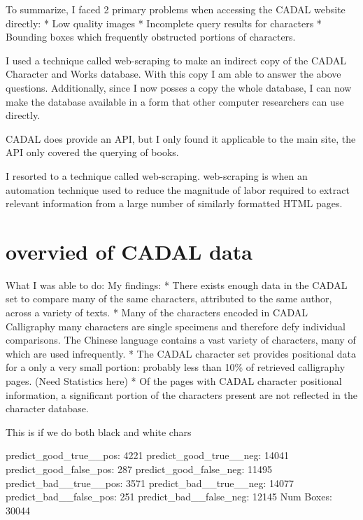     To summarize, I faced 2 primary problems when accessing the CADAL website directly:
        *  Low quality images
        *  Incomplete query results for characters
        *  Bounding boxes which frequently obstructed portions of characters.
                    

I used a technique called web-scraping to make an indirect copy of the CADAL Character and Works database.  With this copy I am able to answer the above questions.  Additionally, since I now posses a copy the whole database, I can now make the database available in a form that other computer researchers can use directly.


    CADAL does provide an API, but I only found it applicable to the main site, the API only covered the querying of books.



   I resorted to a technique called web-scraping.  web-scraping is when an automation technique used to reduce the magnitude of labor required to extract relevant information from a large number of similarly formatted HTML pages.






\chapter{overvied of CADAL data}
What I was able to do:
    My findings:
        * There exists enough data in the CADAL set to compare many of the same characters, attributed to the same author, across a variety of texts.
        *  Many of the characters encoded in CADAL Calligraphy many characters are single specimens and therefore defy individual comparisons.  The Chinese language contains a vast variety of characters, many of which are used infrequently.
        *  The CADAL character set provides positional data for a only a very small portion: probably less than 10\% of retrieved calligraphy pages.  (Need Statistics here)
        *  Of the pages with CADAL character positional information, a significant portion of the characters present are not reflected in the character database.
        
        This  is if we do both black and white chars

predict_good_true__pos: 4221
predict_good_true__neg: 14041
predict_good_false_pos: 287
predict_good_false_neg: 11495
predict_bad__true__pos: 3571
predict_bad__true__neg: 14077
predict_bad__false_pos: 251
predict_bad__false_neg: 12145
Num Boxes: 30044

